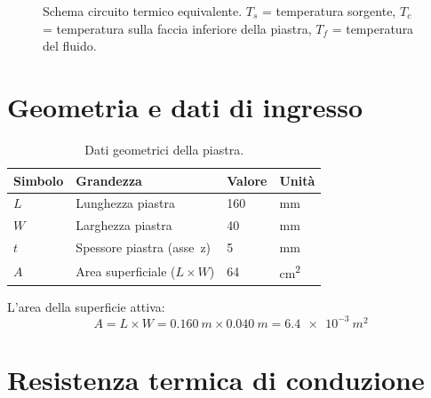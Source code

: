 \documentclass[a4paper,11pt]{article}
\begin{document}
\begin{figure}[H]
\centering
{}
\caption{Schema circuito termico equivalente. $T_s$ = temperatura sorgente,
         $T_c$ = temperatura sulla faccia inferiore della piastra,
         $T_f$ = temperatura del fluido.}
\label{fig:circuit}
\end{figure}

\section{Geometria e dati di ingresso}

\begin{table}[H]
\centering
\caption{Dati geometrici della piastra.}
\begin{tabular}{llll}
\toprule
Simbolo & Grandezza & Valore & Unità \\
\midrule
$L$  & Lunghezza piastra         & 160   & \si{mm} \\
$W$  & Larghezza piastra         & 40    & \si{mm} \\
$t$  & Spessore piastra (asse~z) & 5     & \si{mm} \\
$A$  & Area superficiale ($L\times W$) & 64 & \si{cm^2} \\
\bottomrule
\end{tabular}
\end{table}

L'area della superficie attiva:
\begin{equation}
  A = L \times W = \SI{0.160}{m} \times \SI{0.040}{m} = \SI{6.4e-3}{m^2}
\end{equation}

\section{Resistenza termica di conduzione}
\end{document}
